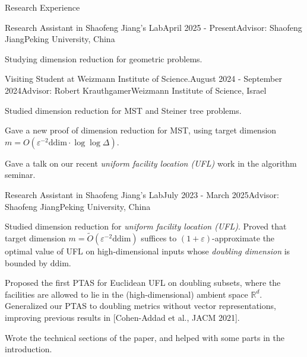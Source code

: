 \documentclass{resume} %
\begin{document}
\begin{rSection}{Research Experience}{}
    \begin{rSubsection}{Research Assistant in Shaofeng Jiang's Lab}{April 2025 - Present}{Advisor: Shaofeng Jiang}{Peking University, China}
        \item Studying dimension reduction for geometric problems.
    \end{rSubsection}

    \begin{rSubsection}{Visiting Student at Weizmann Institute of Science.}{August 2024 - September 2024}{Advisor: Robert Krauthgamer}{Weizmann Institute of Science, Israel}
        \item Studied dimension reduction for MST and Steiner tree problems.
        \item Gave a new proof of dimension reduction for MST, using target dimension $m = O(\varepsilon^{-2} \mathrm{ddim} \cdot \log\log \Delta)$.
        \item Gave a talk on our recent \emph{uniform facility location (UFL)} work in the algorithm seminar.
    \end{rSubsection}

    \begin{rSubsection}{Research Assistant in Shaofeng Jiang's Lab}{July 2023 - March 2025}{Advisor: Shaofeng Jiang}{Peking University, China}
       \item Studied dimension reduction for \emph{uniform facility location (UFL)}. 
       Proved that target dimension $m = \tilde{O}(\varepsilon^{-2} \mathrm{ddim})$ suffices to $(1+\varepsilon)$-approximate the optimal value of UFL on high-dimensional inputs whose \emph{doubling dimension} is bounded by $\mathrm{ddim}$.
       \item Proposed the first PTAS for Euclidean UFL on doubling subsets, where the facilities are allowed to lie in the (high-dimensional) ambient space $\mathbb{R}^d$. 
       Generalized our PTAS to doubling metrics without vector representations, improving previous results in [Cohen-Addad et al., JACM 2021].
       \item Wrote the technical sections of the paper, and helped with some parts in the introduction.
    \end{rSubsection}


\end{rSection}
\end{document}
